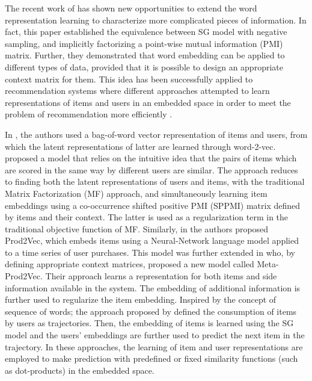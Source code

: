 \documentclass[10pt,journal,compsoc]{IEEEtran}
\begin{document}
\begin{sloppypar}
The recent work of \cite{levy_14} has shown new opportunities to extend the word representation learning to characterize more complicated pieces of information. In fact, this paper established the equivalence between SG model with negative sampling, and implicitly factorizing a point-wise mutual information (PMI) matrix. Further, they demonstrated that word embedding can be applied to different types of data, provided that it is possible to design an appropriate context matrix for them. This idea has been successfully applied to recommendation systems where different approaches attempted to learn representations of items and users in an embedded space in order to meet the problem of recommendation more efficiently \cite{guardia_15, liang_16, DBLP:conf/kdd/GrbovicRDBSBS15}.


\medskip

In \cite{ He:2017:NCF:3038912.3052569}, the authors
used a bag-of-word vector representation of items and users, from which the latent representations of latter are learned through word-2-vec.
\cite{liang_16} proposed a model that relies on the intuitive idea that the pairs of items which are scored in the same way by different users are similar. The approach reduces to finding both the latent representations of users and items, with the traditional Matrix Factorization (MF) approach, and simultaneously learning item embeddings using a co-occurrence shifted positive PMI (SPPMI) matrix defined by items and their context. The latter is used as a regularization term in the traditional objective function of MF. Similarly, in \cite{DBLP:conf/kdd/GrbovicRDBSBS15} the authors proposed Prod2Vec, which embeds items using a Neural-Network language model applied to a time series of user purchases. This model was further extended in \cite{vasile_16} who, by defining appropriate context matrices, proposed a new model called Meta-Prod2Vec. Their approach learns a representation for both items and side information available in the system. The embedding of additional information is further used to regularize the item embedding.
Inspired by the concept of sequence of words; the approach proposed by \cite{guardia_15} defined the consumption of items by users as trajectories. Then, the embedding of items is learned using the SG model and the users' embeddings are further used to predict the next item in the trajectory. In these approaches, the learning of item and user representations are employed to make prediction with predefined or fixed similarity functions (such as dot-products) in the embedded space.


\end{sloppypar}
\end{document}
